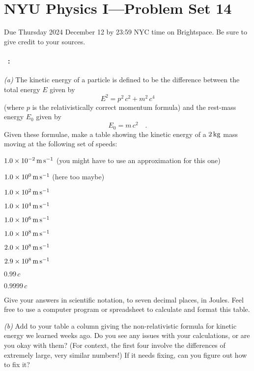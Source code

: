 \documentclass[12pt]{article}
\begin{document}
\section*{NYU Physics I---Problem Set 14}

Due Thursday 2024 December 12 by 23:59 NYC time on Brightspace.
Be sure to give credit to your sources.

\paragraph{\problemname~\theproblem:}%
\textsl{(a)} The kinetic energy of a particle is defined to be the difference between the
total energy $E$ given by
\begin{equation}
E^2 = p^2\,c^2 + m^2\,c^4
\end{equation}
(where $p$ is the relativistically correct momentum formula) and the
rest-mass energy $E_0$ given by
\begin{equation}
E_0 = m\,c^2 \quad.
\end{equation}
Given these formulae, make a table showing the kinetic energy of a $2\,\mathrm{kg}$ mass
moving at the following set of speeds:
\begin{trivlist}
\item $1.0\times10^{-2}\,\mathrm{m}\,\mathrm{s}^{-1}$ (you might have to use an approximation for this one)
\item $1.0\times10^0\,\mathrm{m}\,\mathrm{s}^{-1}$ (here too maybe)
\item $1.0\times10^2\,\mathrm{m}\,\mathrm{s}^{-1}$
\item $1.0\times10^4\,\mathrm{m}\,\mathrm{s}^{-1}$
\item $1.0\times10^6\,\mathrm{m}\,\mathrm{s}^{-1}$
\item $1.0\times10^8\,\mathrm{m}\,\mathrm{s}^{-1}$
\item $2.0\times10^8\,\mathrm{m}\,\mathrm{s}^{-1}$
\item $2.9\times10^8\,\mathrm{m}\,\mathrm{s}^{-1}$
\item $0.99\,c$
\item $0.9999\,c$
\end{trivlist}
Give your answers in scientific notation, to seven decimal places, in Joules. Feel free to use
a computer program or spreadsheet to calculate and format this table.

\textsl{(b)} Add to your table a column giving the non-relativistic
formula for kinetic energy we learned weeks ago. Do you see any issues
with your calculations, or are you okay with them? (For context, the
first four involve the differences of extremely large, very similar
numbers!) If it needs fixing, can you figure out how to fix it?
\end{document}
